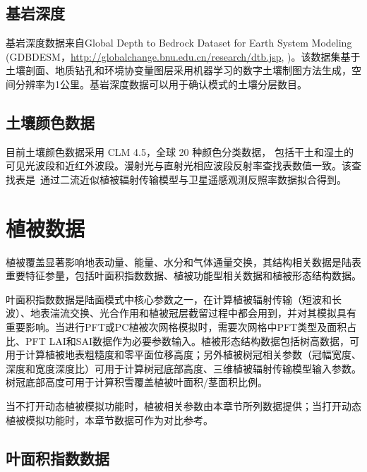 \subsection{基岩深度}\label{基岩深度}

基岩深度数据来自Global Depth to Bedrock Dataset for Earth System Modeling (GDBDESM，\url{http://globalchange.bnu.edu.cn/research/dtb.jsp}, \citet{shangguan2017mapping})。该数据集基于土壤剖面、地质钻孔和环境协变量图层采用机器学习的数字土壤制图方法生成，空间分辨率为1公里。基岩深度数据可以用于确认模式的土壤分层数目。


\subsection{土壤颜色数据}\label{土壤颜色}
目前土壤颜色数据采用 CLM 4.5，全球 20 种颜色分类数据，
包括干土和湿土的可见光波段和近红外波段。漫射光与直射光相应波段反射率查找表数值一致。该查找表是~\citet{lawrence2007representing}通过二流近似植被辐射传输模型与卫星遥感观测反照率数据拟合得到。


\section{植被数据}\label{植被数据}

植被覆盖显著影响地表动量、能量、水分和气体通量交换，其结构相关数据是陆表重要特征参量，包括叶面积指数数据、植被功能型相关数据和植被形态结构数据。

叶面积指数数据是陆面模式中核心参数之一，在计算植被辐射传输（短波和长波）、地表湍流交换、光合作用和植被冠层截留过程中都会用到，并对其模拟具有重要影响。当进行PFT或PC植被次网格模拟时，需要次网格中PFT类型及面积占比、PFT LAI和SAI数据作为必要参数输入。植被形态结构数据包括树高数据，可用于计算植被地表粗糙度和零平面位移高度；另外植被树冠相关参数（冠幅宽度、深度和宽度深度比）可用于计算树冠底部高度、三维植被辐射传输模型输入参数。树冠底部高度可用于计算积雪覆盖植被叶面积/茎面积比例。

当不打开动态植被模拟功能时，植被相关参数由本章节所列数据提供；当打开动态植被模拟功能时，本章节数据可作为对比参考。


\subsection{叶面积指数数据}\label{叶面积指数数据}

